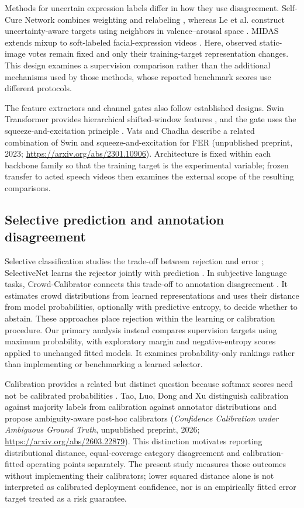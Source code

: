 \documentclass[pdflatex,sn-mathphys-num]{sn-jnl}
\begin{document}
Methods for uncertain expression labels differ in how they use disagreement. Self-Cure Network combines weighting and relabeling \cite{wang2020scn}, whereas Le et al. construct uncertainty-aware targets using neighbors in valence--arousal space \cite{le2023uncertainty}. MIDAS extends mixup to soft-labeled facial-expression videos \cite{kawamura2024midas}. Here, observed static-image votes remain fixed and only their training-target representation changes. This design examines a supervision comparison rather than the additional mechanisms used by those methods, whose reported benchmark scores use different protocols.

The feature extractors and channel gates also follow established designs. Swin Transformer provides hierarchical shifted-window features \cite{liu2021swin}, and the gate uses the squeeze-and-excitation principle \cite{hu2018senet}. Vats and Chadha describe a related combination of Swin and squeeze-and-excitation for FER (unpublished preprint, 2023; \url{https://arxiv.org/abs/2301.10906}). Architecture is fixed within each backbone family so that the training target is the experimental variable; frozen transfer to acted speech videos then examines the external scope of the resulting comparisons.

\subsection{Selective prediction and annotation disagreement}
Selective classification studies the trade-off between rejection and error \cite{geifman2017selective}; SelectiveNet learns the rejector jointly with prediction \cite{geifman2019selectivenet}. In subjective language tasks, Crowd-Calibrator connects this trade-off to annotation disagreement \cite{khurana2024crowd}. It estimates crowd distributions from learned representations and uses their distance from model probabilities, optionally with predictive entropy, to decide whether to abstain. These approaches place rejection within the learning or calibration procedure. Our primary analysis instead compares supervision targets using maximum probability, with exploratory margin and negative-entropy scores applied to unchanged fitted models. It examines probability-only rankings rather than implementing or benchmarking a learned selector.

Calibration provides a related but distinct question because softmax scores need not be calibrated probabilities \cite{guo2017calibration}. Tao, Luo, Dong and Xu distinguish calibration against majority labels from calibration against annotator distributions and propose ambiguity-aware post-hoc calibrators (\emph{Confidence Calibration under Ambiguous Ground Truth}, unpublished preprint, 2026; \url{https://arxiv.org/abs/2603.22879}). This distinction motivates reporting distributional distance, equal-coverage category disagreement and calibration-fitted operating points separately. The present study measures those outcomes without implementing their calibrators; lower squared distance alone is not interpreted as calibrated deployment confidence, nor is an empirically fitted error target treated as a risk guarantee.
\end{document}

